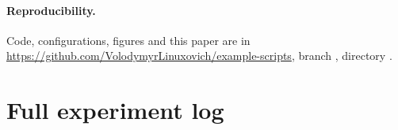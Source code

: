 \documentclass[11pt]{article}
\begin{document}
\paragraph{Reproducibility.} Code, configurations, figures and this paper are in
\url{https://github.com/VolodymyrLinuxovich/example-scripts}, branch ,
directory .




\appendix
\section{Full experiment log}

\end{document}
